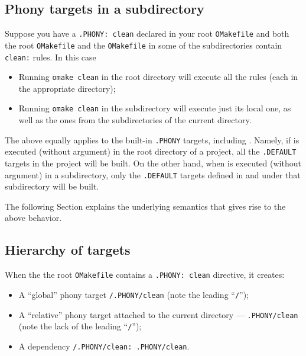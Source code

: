 \subsection{Phony targets in a subdirectory}
\label{section:PHONY-in-subdirs}

Suppose you have a \verb+.PHONY: clean+ declared in your root \verb+OMakefile+ and
both the root \verb+OMakefile+ and the \verb+OMakefile+ in some of the subdirectories contain
\verb+clean:+ rules.  In this case
\begin{itemize}
\item Running \verb+omake clean+ in the root directory will execute all the rules (each in the
appropriate directory);
\item Running \verb+omake clean+ in the subdirectory will execute just its local one, as well as the
ones from the subdirectories of the current directory.
\end{itemize}

The above equally applies to the built-in \verb+.PHONY+ targets, including .
Namely, if \OMake{} is executed (without argument) in the root directory of a project, all the
\verb+.DEFAULT+ targets in the project will be built. On the other hand, when \OMake{} is executed
(without argument) in a subdirectory, only the \verb+.DEFAULT+ targets defined in and under that
subdirectory will be built.

The following Section explains the underlying semantics that gives rise to the above behavior.

\subsection{Hierarchy of  targets}
\label{section:PHONY-hierarchy}

When the the root \verb+OMakefile+ contains a \verb+.PHONY: clean+ directive, it creates:
\begin{itemize}
\item A ``global'' phony target \verb+/.PHONY/clean+ (note the leading ``\verb+/+'');
\item A ``relative'' phony target attached to the current directory --- \verb+.PHONY/clean+ (note
the lack of the leading ``\verb+/+'');
\item A dependency \verb+/.PHONY/clean: .PHONY/clean+.
\end{itemize}

